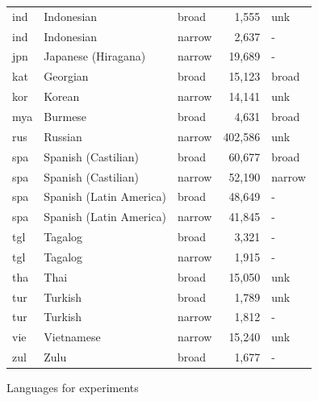 {\begin{tabularx}{\textwidth}{|Xll >{\raggedright}rl|}
ind                & Indonesian              & broad                  & 1,555                      & unk               \\
ind                & Indonesian              & narrow                 & 2,637                      & -                 \\
jpn                & Japanese (Hiragana)     & narrow                 & 19,689                     & -                 \\
kat                & Georgian                & broad                  & 15,123                     & broad             \\
kor                & Korean                  & narrow                 & 14,141                     & unk               \\
mya                & Burmese                 & broad                  & 4,631                      & broad             \\
rus                & Russian                 & narrow                 & 402,586                    & unk               \\
spa                & Spanish (Castilian)     & broad                  & 60,677                     & broad             \\
spa                & Spanish (Castilian)     & narrow                 & 52,190                     & narrow            \\
spa                & Spanish (Latin America) & broad                  & 48,649                     & -                 \\
spa                & Spanish (Latin America) & narrow                 & 41,845                     & -                 \\
tgl                & Tagalog                 & broad                  & 3,321                      & -                 \\
tgl                & Tagalog                 & narrow                 & 1,915                      & -                 \\
tha                & Thai                    & broad                  & 15,050                     & unk               \\
tur                & Turkish                 & broad                  & 1,789                      & unk               \\
tur                & Turkish                 & narrow                 & 1,812                      & -                 \\
vie                & Vietnamese              & narrow                 & 15,240                     & unk               \\
zul                & Zulu                    & broad                  & 1,677                      & -                 \\ \hline
\end{tabularx}}{Languages for experiments}

